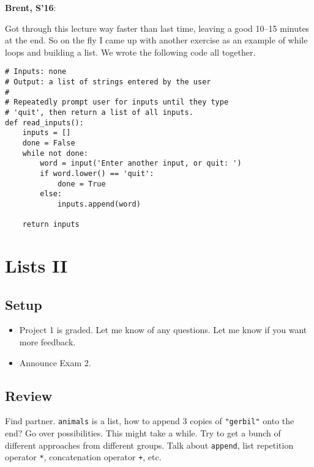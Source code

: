 \documentclass{article}
\newenvironment{reflect}[1]
{
  \noindent
  \begin{lrbox}{\reflectbox}
    \begin{minipage}[t]{\textwidth}
      \textbf{#1}:
}{
    \end{minipage}
  \end{lrbox}
  \fbox{\usebox{\reflectbox}}
}
\begin{document}
\begin{reflect}{Brent, S'16}
  Got through this lecture way faster than last time, leaving a good
  10--15 minutes at the end.  So on the fly I came up with another
  exercise as an example of while loops and building a list.  We wrote
  the following code all together.
\end{reflect}

\begin{verbatim}
# Inputs: none
# Output: a list of strings entered by the user
#
# Repeatedly prompt user for inputs until they type
# 'quit', then return a list of all inputs.
def read_inputs():
    inputs = []
    done = False
    while not done:
        word = input('Enter another input, or quit: ')
        if word.lower() == 'quit':
            done = True
        else:
            inputs.append(word)

    return inputs
\end{verbatim}

\newpage
\section{Lists II}

\subsection*{Setup}
\begin{itemize}
\item Project 1 is graded.  Let me know of any questions.  Let me know
  if you want more feedback.
\item Announce Exam 2.
\end{itemize}

\subsection*{Review}
Find partner. \verb|animals| is a list, how to append 3 copies of
\verb|"gerbil"| onto the end?  Go over possibilities.  This might take
a while.  Try to get a bunch of different approaches from different
groups.  Talk about \verb|append|, list repetition operator \verb|*|,
concatenation operator \verb|+|, etc.
\end{document}
